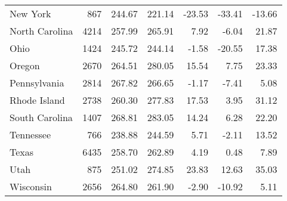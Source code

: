 \begin{table}[ht]
\begin{center}
\begin{tabular}{lrrrrrr}
  New York & 867 & 244.67 & 221.14 & -23.53 & -33.41 & -13.66 \\ 
  North Carolina & 4214 & 257.99 & 265.91 & 7.92 & -6.04 & 21.87 \\ 
  Ohio & 1424 & 245.72 & 244.14 & -1.58 & -20.55 & 17.38 \\ 
  Oregon & 2670 & 264.51 & 280.05 & 15.54 & 7.75 & 23.33 \\ 
  Pennsylvania & 2814 & 267.82 & 266.65 & -1.17 & -7.41 & 5.08 \\ 
  Rhode Island & 2738 & 260.30 & 277.83 & 17.53 & 3.95 & 31.12 \\ 
  South Carolina & 1407 & 268.81 & 283.05 & 14.24 & 6.28 & 22.20 \\ 
  Tennessee & 766 & 238.88 & 244.59 & 5.71 & -2.11 & 13.52 \\ 
  Texas & 6435 & 258.70 & 262.89 & 4.19 & 0.48 & 7.89 \\ 
  Utah & 875 & 251.02 & 274.85 & 23.83 & 12.63 & 35.03 \\ 
  Wisconsin & 2656 & 264.80 & 261.90 & -2.90 & -10.92 & 5.11 \\ 
   \hline
\end{tabular}
\end{center}
\end{table}
